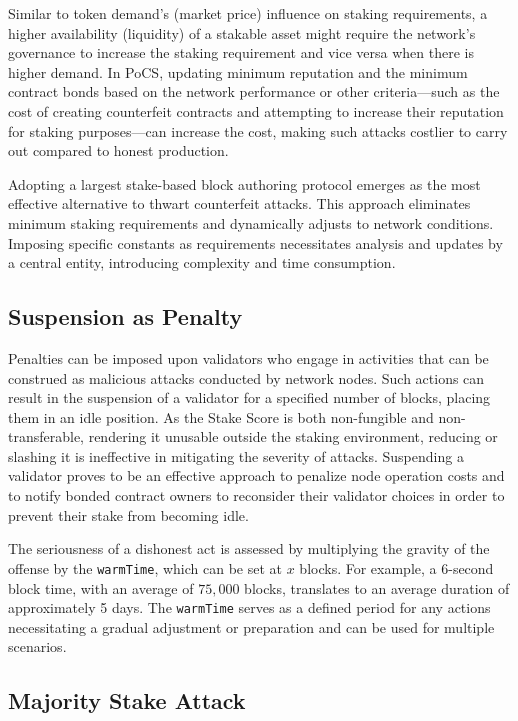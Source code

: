 \documentclass{article}
\begin{document}
Similar to token demand's (market price) influence on staking requirements, a higher availability (liquidity) of a stakable asset might require the network's governance to increase the staking requirement and vice versa when there is higher demand. In PoCS, updating minimum reputation and the minimum contract bonds based on the network performance or other criteria—such as the cost of creating counterfeit contracts and attempting to increase their reputation for staking purposes—can increase the cost, making such attacks costlier to carry out compared to honest production. 

Adopting a largest stake-based block authoring protocol emerges as the most effective alternative to thwart counterfeit attacks. This approach eliminates minimum staking requirements and dynamically adjusts to network conditions. Imposing specific constants as requirements necessitates analysis and updates by a central entity, introducing complexity and time consumption.

\subsection{Suspension as Penalty}

Penalties can be imposed upon validators who engage in activities that can be construed as malicious attacks conducted by network nodes. Such actions can result in the suspension of a validator for a specified number of blocks, placing them in an idle position. As the Stake Score is both non-fungible and non-transferable, rendering it unusable outside the staking environment, reducing or slashing it is ineffective in mitigating the severity of attacks. Suspending a validator proves to be an effective approach to penalize node operation costs and to notify bonded contract owners to reconsider their validator choices in order to prevent their stake from becoming idle.

The seriousness of a dishonest act is assessed by multiplying the gravity of the offense by the \texttt{warmTime}, which can be set at \( x \) blocks. For example, a 6-second block time, with an average of \( 75,000 \) blocks, translates to an average duration of approximately 5 days. The \texttt{warmTime} serves as a defined period for any actions necessitating a gradual adjustment or preparation and can be used for multiple scenarios.

\subsection{Majority Stake Attack}
\end{document}
